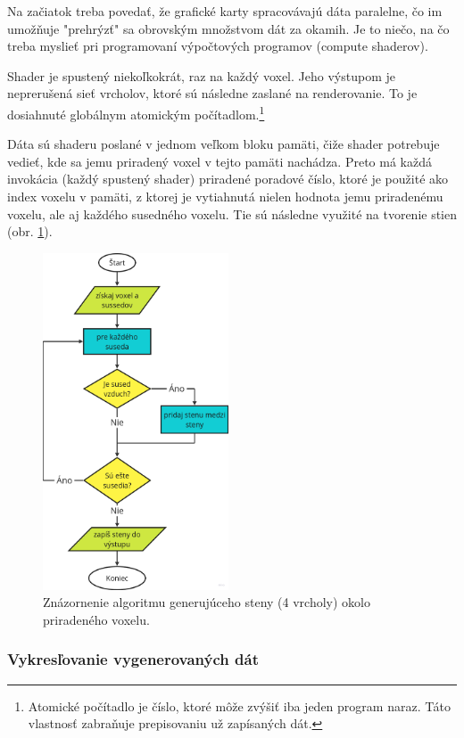 \documentclass[12pt]{article}
\begin{document}
Na začiatok treba povedať, že grafické karty spracovávajú dáta paralelne,
čo im umožňuje "prehrýzť" sa obrovským množstvom dát za okamih.
Je to niečo, na čo treba myslieť pri programovaní výpočtových programov
(compute shaderov).

Shader je spustený niekoľkokrát, raz na každý voxel. Jeho výstupom je
neprerušená sieť vrcholov, ktoré sú následne zaslané na renderovanie.
To je dosiahnuté globálnym atomickým počítadlom.\footnote
{Atomické počítadlo je číslo, ktoré môže zvýšiť iba jeden program naraz. Táto
	vlastnosť zabraňuje prepisovaniu už zapísaných dát.}

Dáta sú shaderu poslané v jednom veľkom bloku pamäti, čiže shader potrebuje
vedieť, kde sa jemu priradený voxel v tejto pamäti nachádza. Preto má každá
invokácia (každý spustený shader) priradené poradové číslo, ktoré
je použité ako index voxelu v pamäti, z ktorej je vytiahnutá nielen
hodnota jemu priradenému voxelu, ale aj každého susedného voxelu. Tie sú
následne využité na tvorenie stien
(obr. \ref{obr:diagram algoritmu generujuceho vertexy}).

\begin{figure}[ht]
	\centering
	\includegraphics[height=10cm]{res/diagram_generovanie_voxelov.png}
	\caption{Znázornenie algoritmu generujúceho steny (4 vrcholy) okolo priradeného voxelu.}
	\label{obr:diagram algoritmu generujuceho vertexy}
\end{figure}

\newpage
\subsubsection{Vykresľovanie vygenerovaných dát}
\end{document}
